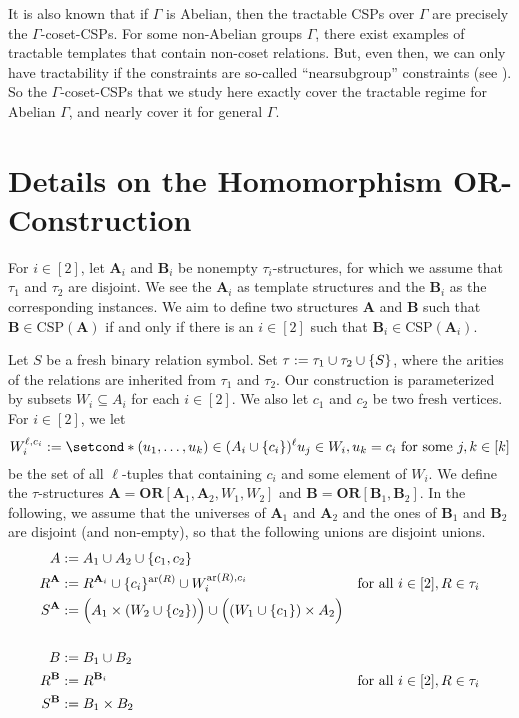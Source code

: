 \documentclass[a4paper,english, thm-restate]{lipics-v2021}
\DeclarePairedDelimiter\set{\lbrace}{\rbrace}
\newcommand{\sig}{\tau}
\newcommand{\arity}[1]{\operatorname*{ar}(#1)}
\newcommand{\StructA}{\mathbf{A}}
\newcommand{\StructB}{\mathbf{B}}
\newcommand{\CSP}[1]{\mathrm{CSP}(#1)}
\newcommand{\ORparam}[1]{\mathbf{OR}[#1]}
\newcommand{\OR}[1]{\mathbf{OR}[#1]}
\begin{document}
	
	
	It is also known that if $\Gamma$ is Abelian, then the tractable CSPs over $\Gamma$ are precisely the $\Gamma$-coset-CSPs. For some non-Abelian groups $\Gamma$, there exist examples of tractable templates that contain non-coset relations. But, even then, we can only have tractability if the constraints are so-called ``nearsubgroup'' constraints (see \cite{feder1993monotone}).
	So the $\Gamma$-coset-CSPs that we study here exactly cover the tractable regime for Abelian $\Gamma$, and nearly cover it for general $\Gamma$.
	
	
	
	\section{Details on the Homomorphism OR-Construction}
	\label{app:homomorphism-or}
	
	For $i \in [2]$, let $\StructA_i$ and $\StructB_i$ be nonempty $\sig_i$-structures,
	for which we assume that $\sig_1$ and $\sig_2$ are disjoint.
	We see the $\StructA_i$ as template structures and the $\StructB_i$ as the corresponding instances.
	We aim to define two structures $\StructA$ and $\StructB$ such that $\StructB \in \CSP{\StructA}$ if and only if there is an $i \in [2]$ such that $\StructB_i \in \CSP{\StructA_i}$.
	
	
	
	Let $S$ be a fresh binary relation symbol.
	Set $\sig := \sig_1 \cup \sig_2 \cup \set{S}$,
	where the arities of the relations are inherited from $\sig_1$ and $\sig_2$.
	Our construction is parameterized by subsets $W_i \subseteq A_i$ for each $i\in[2]$.
	We also let $c_1$ and $c_2$ be two fresh vertices.
	For $i\in[2]$, 
	we let 
	\[W_i^{\ell,c_i} := \setcond*{(u_1,\dots,u_k)\in (A_i\cup\set{c_i})^\ell}{u_j \in W_i, u_k = c_i \text{ for some } j,k \in [k]}\]
	be the set of all $\ell$-tuples that containing $c_i$ and some element of $W_i$.
	We define the $\sig$-structures $\StructA = \ORparam{\StructA_1,\StructA_2,W_1,W_2}$ and 
	$\StructB = \OR{\StructB_1,\StructB_2}$.
	In the following, we assume that the universes of $\StructA_1$ and $\StructA_2$
	and the ones of $\StructB_1$ and $\StructB_2$ are disjoint (and non-empty), so that
	the following unions are disjoint unions.
	\begin{align*}
		A &:= A_1 \cup A_2 \cup \set{c_1,c_2}\\
		R^\StructA & :=R^{\StructA_i}  \cup   \set{c_i}^{\arity{R}} \cup W_i^{\arity{R}, c_i} & \text{for all } i \in [2], R \in \sig_i\\
		S^\StructA & :=  \Big( A_1 \times (W_2 \cup \set{c_{2}})\Big)
		\cup \Big( (W_1 \cup \set{c_1}) \times A_{2}\Big)\\\\
		B &:= B_1 \cup B_2\\
		R^\StructB &:= R^{\StructB_i}  & \text{for all } i \in [2], R \in \sig_i\\
		S^\StructB &:= B_1 \times B_2
	\end{align*}
	
\end{document}
